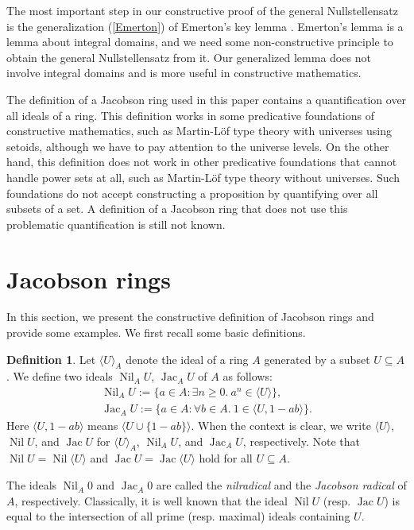 \documentclass[11pt]{article}
\theoremstyle{definition}
\newtheorem{definition}{Definition}[section]
\newcommand\gen[1]{\langle{#1}\rangle}
\DeclareMathOperator{\Nil}{Nil}
\DeclareMathOperator{\Jac}{Jac}
\begin{document}
The most important step in our constructive proof of the general Nullstellensatz is the generalization (\cref{Emerton}) of Emerton's key lemma \cite[Lemma 6]{Eme}.
Emerton's lemma is a lemma about integral domains, and we need some non-constructive principle to obtain the general Nullstellensatz from it.
Our generalized lemma does not involve integral domains and is more useful in constructive mathematics.

The definition of a Jacobson ring used in this paper contains a quantification over all ideals of a ring.
This definition works in some predicative foundations of constructive mathematics, such as Martin-Löf type theory with universes using setoids, although we have to pay attention to the universe levels.
On the other hand, this definition does not work in other predicative foundations that cannot handle power sets at all, such as Martin-Löf type theory without universes.
Such foundations do not accept constructing a proposition by quantifying over all subsets of a set.
A definition of a Jacobson ring that does not use this problematic quantification is still not known.

\section{Jacobson rings}
In this section, we present the constructive definition of Jacobson rings and provide some examples.
We first recall some basic definitions.
\begin{definition}
    Let ${\gen U}_A$ denote the ideal of a ring $A$ generated by a subset $U\subseteq A$. We define two ideals $\Nil_A U$, $\Jac_A U$ of $A$ as follows:
    \begin{gather*}
    \Nil_A U:=\{a\in A:\exists n\ge0.\ a^n\in\gen U\},\\\Jac_AU:=\{a\in A:\forall b\in A.\ 1\in\gen{U,1-ab}\}.
    \end{gather*}
    Here $\gen{U,1-ab}$ means $\gen{U\cup\{1-ab\}}$. When the context is clear, we write $\gen U$, $\Nil U$, and $\Jac U$ for ${\gen U}_A$, $\Nil_AU$, and $\Jac_AU$, respectively.
    Note that $\Nil U=\Nil{\gen{U}}$ and $\Jac U=\Jac{\gen{U}}$ hold for all $U\subseteq A$.
\end{definition}
The ideals $\Nil_A0$ and $\Jac_A0$ are called the \emph{nilradical} and the \emph{Jacobson radical} of $A$, respectively.
Classically, it is well known that the ideal $\Nil U$ (resp. $\Jac U$) is equal to the intersection of all prime (resp. maximal) ideals containing $U$.
\end{document}
